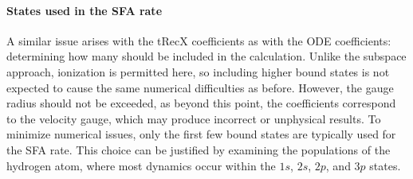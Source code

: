 
\paragraph{States used in the SFA rate}
A similar issue arises with the tRecX coefficients as with the ODE coefficients: determining how many should be included in the calculation.
Unlike the subspace approach, ionization is permitted here, so including higher bound states is not expected to cause the same numerical difficulties as before.
However, the gauge radius should not be exceeded, as beyond this point, the coefficients correspond to the velocity gauge, which may produce incorrect or unphysical results.
To minimize numerical issues, only the first few bound states are typically used for the SFA rate.
This choice can be justified by examining the populations of the hydrogen atom, where most dynamics occur within the $1s$, $2s$, $2p$, and $3p$ states.











